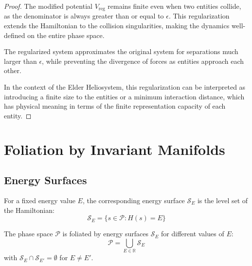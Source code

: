 \begin{proof}
The modified potential $V_{\text{reg}}$ remains finite even when two entities collide, as the denominator is always greater than or equal to $\epsilon$. This regularization extends the Hamiltonian to the collision singularities, making the dynamics well-defined on the entire phase space.

The regularized system approximates the original system for separations much larger than $\epsilon$, while preventing the divergence of forces as entities approach each other.

In the context of the Elder Heliosystem, this regularization can be interpreted as introducing a finite size to the entities or a minimum interaction distance, which has physical meaning in terms of the finite representation capacity of each entity.
\end{proof}

\section{Foliation by Invariant Manifolds}

\subsection{Energy Surfaces}

\begin{definition}
For a fixed energy value $E$, the corresponding energy surface $\mathcal{S}_E$ is the level set of the Hamiltonian:
\begin{equation}
\mathcal{S}_E = \{s \in \mathcal{P} : H(s) = E\}
\end{equation}
\end{definition}

\begin{theorem}
The phase space $\mathcal{P}$ is foliated by energy surfaces $\mathcal{S}_E$ for different values of $E$:
\begin{equation}
\mathcal{P} = \bigcup_{E \in \mathbb{R}} \mathcal{S}_E
\end{equation}
with $\mathcal{S}_E \cap \mathcal{S}_{E'} = \emptyset$ for $E \neq E'$.
\end{theorem}

